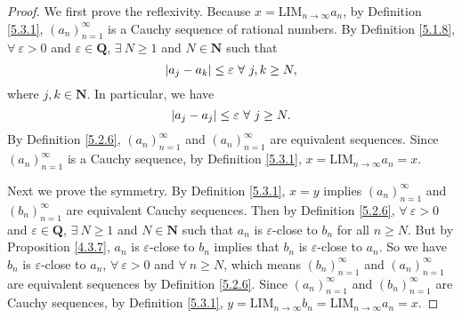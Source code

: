 \begin{proof}
    We first prove the reflexivity.
    Because \(x = \text{LIM}_{n \to \infty} a_n\), by Definition \ref{5.3.1}, \((a_n)_{n = 1}^{\infty}\) is a Cauchy sequence of rational numbers.
    By Definition \ref{5.1.8}, \(\forall\ \varepsilon > 0\) and \(\varepsilon \in \mathbf{Q}\), \(\exists\ N \geq 1\) and \(N \in \mathbf{N}\) such that
    \[
        \abs*{a_j - a_k} \leq \varepsilon \ \forall\ j, k \geq N,
    \]
    where \(j, k \in \mathbf{N}\).
    In particular, we have
    \[
        \abs*{a_j - a_j} \leq \varepsilon \ \forall\ j \geq N.
    \]
    By Definition \ref{5.2.6}, \((a_n)_{n = 1}^{\infty}\) and \((a_n)_{n = 1}^{\infty}\) are equivalent sequences.
    Since \((a_n)_{n = 1}^{\infty}\) is a Cauchy sequence, by Definition \ref{5.3.1}, \(x = \text{LIM}_{n \to \infty} a_n = x\).

    Next we prove the symmetry.
    By Definition \ref{5.3.1}, \(x = y\) implies \((a_n)_{n = 1}^{\infty}\) and \((b_n)_{n = 1}^{\infty}\) are equivalent Cauchy sequences.
    Then by Definition \ref{5.2.6}, \(\forall\ \varepsilon > 0\) and \(\varepsilon \in \mathbf{Q}\), \(\exists\ N \geq 1\) and \(N \in \mathbf{N}\) such that \(a_n\) is \(\varepsilon\)-close to \(b_n\) for all \(n \geq N\).
    But by Proposition \ref{4.3.7}, \(a_n\) is \(\varepsilon\)-close to \(b_n\) implies that \(b_n\) is \(\varepsilon\)-close to \(a_n\).
    So we have \(b_n\) is \(\varepsilon\)-close to \(a_n\), \(\forall\ \varepsilon > 0\) and \(\forall\ n \geq N\), which means \((b_n)_{n = 1}^{\infty}\) and \((a_n)_{n = 1}^{\infty}\) are equivalent sequences by Definition \ref{5.2.6}.
    Since \((a_n)_{n = 1}^{\infty}\) and \((b_n)_{n = 1}^{\infty}\) are Cauchy sequences, by Definition \ref{5.3.1}, \(y = \text{LIM}_{n \to \infty} b_n = \text{LIM}_{n \to \infty} a_n = x\).


\end{proof}

